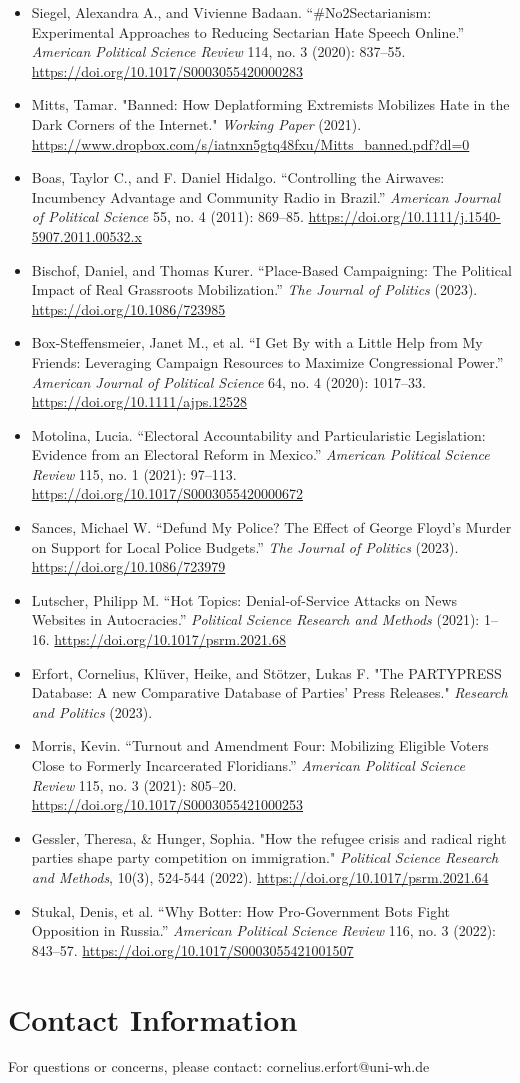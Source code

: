\documentclass[12pt]{article}
\begin{document}
\begin{itemize}
    \item Siegel, Alexandra A., and Vivienne Badaan. “\#No2Sectarianism: Experimental Approaches to Reducing Sectarian Hate Speech Online.” \textit{American Political Science Review} 114, no. 3 (2020): 837–55. \url{https://doi.org/10.1017/S0003055420000283}
    \item Mitts, Tamar. "Banned: How Deplatforming Extremists Mobilizes Hate in the Dark Corners of the Internet." \textit{Working Paper} (2021). \url{https://www.dropbox.com/s/iatnxn5gtq48fxu/Mitts_banned.pdf?dl=0}
    \item Boas, Taylor C., and F. Daniel Hidalgo. “Controlling the Airwaves: Incumbency Advantage and Community Radio in Brazil.” \textit{American Journal of Political Science} 55, no. 4 (2011): 869–85. \url{https://doi.org/10.1111/j.1540-5907.2011.00532.x}
    \item Bischof, Daniel, and Thomas Kurer. “Place-Based Campaigning: The Political Impact of Real Grassroots Mobilization.” \textit{The Journal of Politics} (2023). \url{https://doi.org/10.1086/723985}
    \item Box-Steffensmeier, Janet M., et al. “I Get By with a Little Help from My Friends: Leveraging Campaign Resources to Maximize Congressional Power.” \textit{American Journal of Political Science} 64, no. 4 (2020): 1017–33. \url{https://doi.org/10.1111/ajps.12528}
    \item Motolina, Lucia. “Electoral Accountability and Particularistic Legislation: Evidence from an Electoral Reform in Mexico.” \textit{American Political Science Review} 115, no. 1 (2021): 97–113. \url{https://doi.org/10.1017/S0003055420000672}
    \item Sances, Michael W. “Defund My Police? The Effect of George Floyd's Murder on Support for Local Police Budgets.” \textit{The Journal of Politics} (2023). \url{https://doi.org/10.1086/723979}
    \item Lutscher, Philipp M. “Hot Topics: Denial-of-Service Attacks on News Websites in Autocracies.” \textit{Political Science Research and Methods} (2021): 1–16. \url{https://doi.org/10.1017/psrm.2021.68}
    \item Erfort, Cornelius, Klüver, Heike, and Stötzer, Lukas F. "The PARTYPRESS Database: A new Comparative Database of Parties' Press Releases." \textit{Research and Politics} (2023).
    \item Morris, Kevin. “Turnout and Amendment Four: Mobilizing Eligible Voters Close to Formerly Incarcerated Floridians.” \textit{American Political Science Review} 115, no. 3 (2021): 805–20. \url{https://doi.org/10.1017/S0003055421000253}
    \item Gessler, Theresa, \& Hunger, Sophia. "How the refugee crisis and radical right parties shape party competition on immigration." \textit{Political Science Research and Methods}, 10(3), 524-544 (2022). \url{https://doi.org/10.1017/psrm.2021.64}
    \item Stukal, Denis, et al. “Why Botter: How Pro-Government Bots Fight Opposition in Russia.” \textit{American Political Science Review} 116, no. 3 (2022): 843–57. \url{https://doi.org/10.1017/S0003055421001507}
\end{itemize}

\section*{Contact Information}
For questions or concerns, please contact: cornelius.erfort@uni-wh.de
\end{document}
